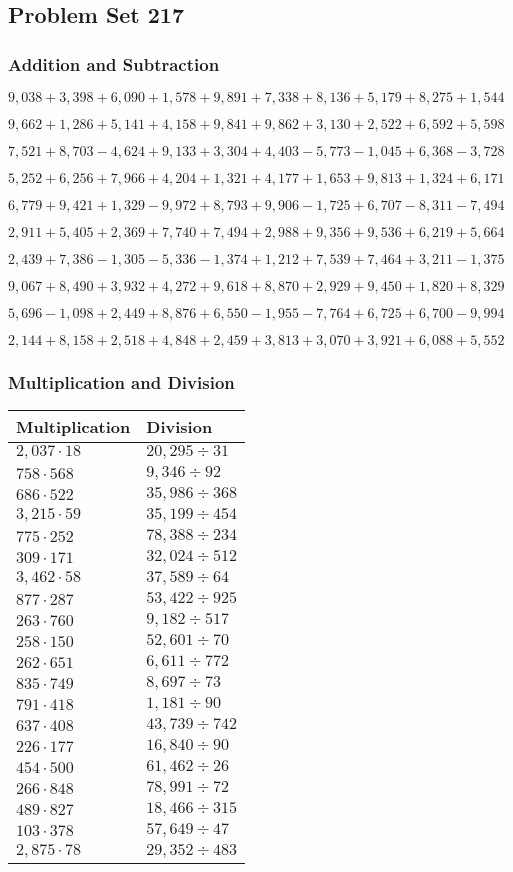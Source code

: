 \hypertarget{problem-set-217}{%
\subsection{Problem Set 217}\label{problem-set-217}}

\hypertarget{addition-and-subtraction}{%
\subsubsection{Addition and
Subtraction}\label{addition-and-subtraction}}

\(9,038+3,398+6,090+1,578+9,891+7,338+8,136+5,179+8,275+1,544\)

\(9,662+1,286+5,141+4,158+9,841+9,862+3,130+2,522+6,592+5,598\)

\(7,521+8,703-4,624+9,133+3,304+4,403-5,773-1,045+6,368-3,728\)

\(5,252+6,256+7,966+4,204+1,321+4,177+1,653+9,813+1,324+6,171\)

\(6,779+9,421+1,329-9,972+8,793+9,906-1,725+6,707-8,311-7,494\)

\(2,911+5,405+2,369+7,740+7,494+2,988+9,356+9,536+6,219+5,664\)

\(2,439+7,386-1,305-5,336-1,374+1,212+7,539+7,464+3,211-1,375\)

\(9,067+8,490+3,932+4,272+9,618+8,870+2,929+9,450+1,820+8,329\)

\(5,696-1,098+2,449+8,876+6,550-1,955-7,764+6,725+6,700-9,994\)

\(2,144+8,158+2,518+4,848+2,459+3,813+3,070+3,921+6,088+5,552\)

\hypertarget{multiplication-and-division}{%
\subsubsection{Multiplication and
Division}\label{multiplication-and-division}}

\begin{longtable}[]{@{}ll@{}}
\toprule
Multiplication & Division\tabularnewline
\midrule
\endhead
\(2,037\cdot18\) & \(20,295÷31\)\tabularnewline
\(758\cdot568\) & \(9,346÷92\)\tabularnewline
\(686\cdot522\) & \(35,986÷368\)\tabularnewline
\(3,215\cdot59\) & \(35,199÷454\)\tabularnewline
\(775\cdot252\) & \(78,388÷234\)\tabularnewline
\(309\cdot171\) & \(32,024÷512\)\tabularnewline
\(3,462\cdot58\) & \(37,589÷64\)\tabularnewline
\(877\cdot287\) & \(53,422÷925\)\tabularnewline
\(263\cdot760\) & \(9,182÷517\)\tabularnewline
\(258\cdot150\) & \(52,601÷70\)\tabularnewline
\(262\cdot651\) & \(6,611÷772\)\tabularnewline
\(835\cdot749\) & \(8,697÷73\)\tabularnewline
\(791\cdot418\) & \(1,181÷90\)\tabularnewline
\(637\cdot408\) & \(43,739÷742\)\tabularnewline
\(226\cdot177\) & \(16,840÷90\)\tabularnewline
\(454\cdot500\) & \(61,462÷26\)\tabularnewline
\(266\cdot848\) & \(78,991÷72\)\tabularnewline
\(489\cdot827\) & \(18,466÷315\)\tabularnewline
\(103\cdot378\) & \(57,649÷47\)\tabularnewline
\(2,875\cdot78\) & \(29,352÷483\)\tabularnewline
\bottomrule
\end{longtable}
